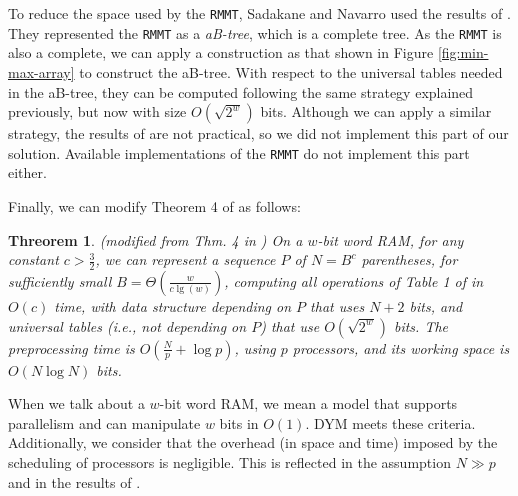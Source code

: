 To reduce the space used by the {\tt RMMT}, Sadakane and Navarro used
the results of \cite{Patrascu:2008:SUC:1470582.1470670}. They
represented the {\tt RMMT} as a \emph{aB-tree}, which is a complete
tree. As the {\tt RMMT} is also a complete, we can apply a
construction as that shown in Figure \ref{fig:min-max-array} to
construct the aB-tree. With respect to the universal tables needed in
the aB-tree, they can be computed following the same strategy
explained previously, but now with size $O(\sqrt{2^{w}})$
bits. Although we can apply a similar strategy, the results of
\cite{Patrascu:2008:SUC:1470582.1470670} are not practical, so we did
not implement this part of our solution. Available implementations of
the {\tt RMMT} do not implement this part either.

Finally, we can modify Theorem 4 of
\cite{Navarro:2014:FFS:2620785.2601073} as follows:
			
\newtheorem{theorem}{Threorem}
\begin{theorem}
  {\sc (modified from Thm. 4 in
    \cite{Navarro:2014:FFS:2620785.2601073})} On a $w$-bit word RAM,
  for any constant $c>\frac{3}{2}$, we can represent a sequence $P$ of
  $N=B^{c}$ parentheses, for sufficiently small
  $B=\Theta(\frac{w}{c\lg(w)})$, computing all operations of Table 1
  of \cite{Navarro:2014:FFS:2620785.2601073} in $O(c)$ time, with data
  structure depending on $P$ that uses $N+2$ bits, and universal
  tables (i.e., not depending on $P$) that use $O(\sqrt{2^{w}})$
  bits. The preprocessing time is $O(\frac{N}{p} + \log p)$, using $p$
  processors, and its working space is $O(N\log N)$ bits.
\end{theorem}
				
When we talk about a $w$-bit word RAM, we mean a model that supports
parallelism and can manipulate $w$ bits in $O(1)$. DYM meets these
criteria. Additionally, we consider that the overhead (in space and
time) imposed by the scheduling of processors is negligible. This is
reflected in the assumption $ N\gg p$ and in the results of
\cite{Blumofe:1999:SMC:324133.324234}.

